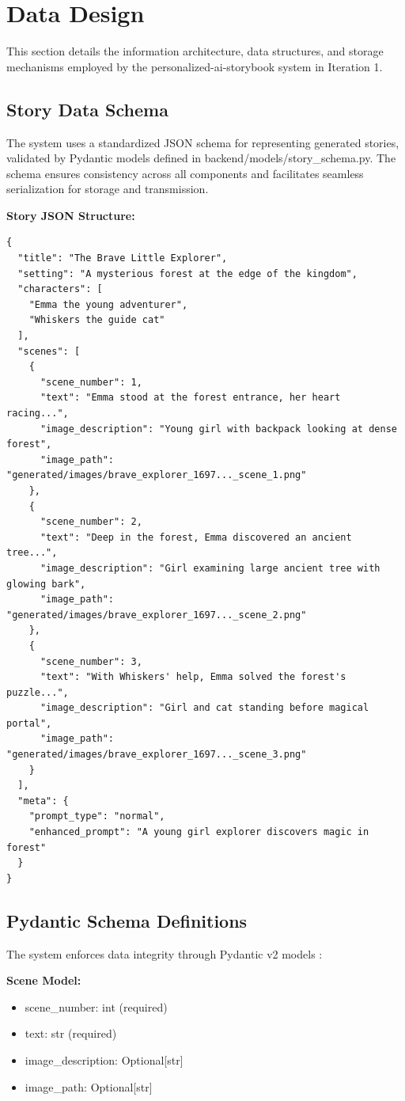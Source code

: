\section{Data Design}
This section details the information architecture, data structures, and storage mechanisms employed by the personalized-ai-storybook system in Iteration 1.

\subsection{Story Data Schema}
The system uses a standardized JSON schema for representing generated stories, validated by Pydantic models defined in backend/models/story\_schema.py. The schema ensures consistency across all components and facilitates seamless serialization for storage and transmission.

\textbf{Story JSON Structure:}
\begin{verbatim}
{
  "title": "The Brave Little Explorer",
  "setting": "A mysterious forest at the edge of the kingdom",
  "characters": [
    "Emma the young adventurer",
    "Whiskers the guide cat"
  ],
  "scenes": [
    {
      "scene_number": 1,
      "text": "Emma stood at the forest entrance, her heart racing...",
      "image_description": "Young girl with backpack looking at dense forest",
      "image_path": "generated/images/brave_explorer_1697..._scene_1.png"
    },
    {
      "scene_number": 2,
      "text": "Deep in the forest, Emma discovered an ancient tree...",
      "image_description": "Girl examining large ancient tree with glowing bark",
      "image_path": "generated/images/brave_explorer_1697..._scene_2.png"
    },
    {
      "scene_number": 3,
      "text": "With Whiskers' help, Emma solved the forest's puzzle...",
      "image_description": "Girl and cat standing before magical portal",
      "image_path": "generated/images/brave_explorer_1697..._scene_3.png"
    }
  ],
  "meta": {
    "prompt_type": "normal",
    "enhanced_prompt": "A young girl explorer discovers magic in forest"
  }
}
\end{verbatim}

\subsection{Pydantic Schema Definitions}
The system enforces data integrity through Pydantic v2 models \cite{pydantic2024}:

\textbf{Scene Model:}
\begin{itemize}
    \item scene\_number: int (required)
    \item text: str (required)
    \item image\_description: Optional[str]
    \item image\_path: Optional[str]
\end{itemize}

